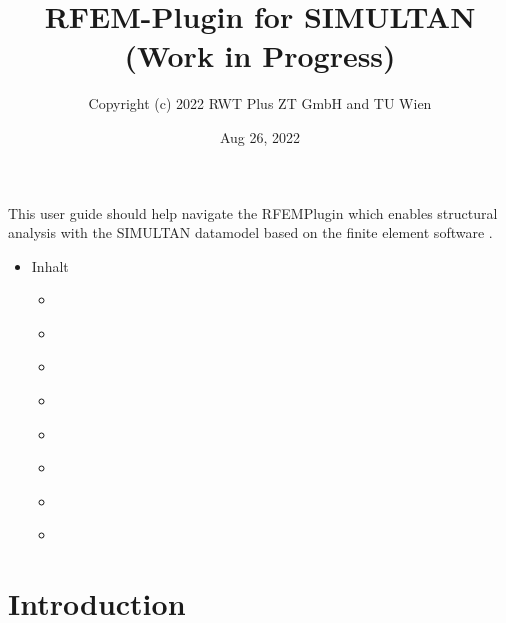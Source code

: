 \documentclass[letterpaper,10pt,english]{jupyterBook}
\title{RFEM-Plugin for SIMULTAN (Work in Progress)}
\date{Aug 26, 2022}
\author{Copyright (c) 2022 RWT Plus ZT GmbH and TU Wien}
\begin{document}
\pagestyle{empty}
\sphinxmaketitle
\pagestyle{plain}
\sphinxtableofcontents
\pagestyle{normal}
\label{\detokenize{intro::doc}}


\sphinxAtStartPar
This user guide should help navigate the RFEM\sphinxhyphen{}Plugin which enables structural analysis with the SIMULTAN datamodel based
on the finite element
software .
\begin{itemize}
\item {} 
\sphinxAtStartPar
Inhalt

\begin{itemize}
\item {} 
\sphinxAtStartPar
{\hyperref[\detokenize{Introduction::doc}]{}}

\item {} 
\sphinxAtStartPar
{\hyperref[\detokenize{Getting_started_with_the_RFem_Plugin::doc}]{}}

\item {} 
\sphinxAtStartPar
{\hyperref[\detokenize{Setting_up_a_problem::doc}]{}}

\item {} 
\sphinxAtStartPar
{\hyperref[\detokenize{Running_a_simulation::doc}]{}}

\item {} 
\sphinxAtStartPar
{\hyperref[\detokenize{Results_of_the_simulation::doc}]{}}

\item {} 
\sphinxAtStartPar
{\hyperref[\detokenize{SIMULTAN_Datastructure_to_incorporate_the_RFem_Data_model::doc}]{}}

\item {} 
\sphinxAtStartPar
{\hyperref[\detokenize{LICENSE::doc}]{}}

\item {} 
\sphinxAtStartPar
{\hyperref[\detokenize{References::doc}]{}}

\end{itemize}
\end{itemize}

\sphinxstepscope


\chapter{Introduction}
\label{\detokenize{Introduction:introduction}}\label{\detokenize{Introduction:id1}}\label{\detokenize{Introduction::doc}}
\end{document}
